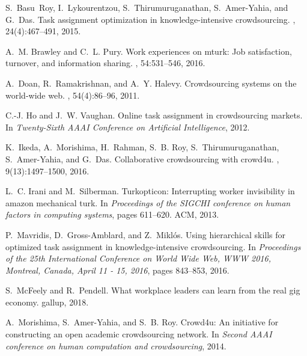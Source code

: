 \documentclass[11pt]{article}
\begin{document}
\begin{thebibliography}{10}

S.~Basu~Roy, I.~Lykourentzou, S.~Thirumuruganathan, S.~Amer-Yahia, and G.~Das.
\newblock Task assignment optimization in knowledge-intensive crowdsourcing.
, 24(4):467--491, 2015.

A.~M. Brawley and C.~L. Pury.
\newblock Work experiences on mturk: Job satisfaction, turnover, and
information sharing.
, 54:531--546, 2016.

A.~Doan, R.~Ramakrishnan, and A.~Y. Halevy.
\newblock Crowdsourcing systems on the world-wide web.
, 54(4):86--96, 2011.

C.-J. Ho and J.~W. Vaughan.
\newblock Online task assignment in crowdsourcing markets.
\newblock In {\em Twenty-Sixth AAAI Conference on Artificial Intelligence},
2012.

K.~Ikeda, A.~Morishima, H.~Rahman, S.~B. Roy, S.~Thirumuruganathan,
S.~Amer-Yahia, and G.~Das.
\newblock Collaborative crowdsourcing with crowd4u.
, 9(13):1497--1500, 2016.

L.~C. Irani and M.~Silberman.
\newblock Turkopticon: Interrupting worker invisibility in amazon mechanical
turk.
\newblock In {\em Proceedings of the SIGCHI conference on human factors in
	computing systems}, pages 611--620. ACM, 2013.

P.~Mavridis, D.~Gross{-}Amblard, and Z.~Mikl{\'{o}}s.
\newblock Using hierarchical skills for optimized task assignment in
knowledge-intensive crowdsourcing.
\newblock In {\em Proceedings of the 25th International Conference on World
	Wide Web, {WWW} 2016, Montreal, Canada, April 11 - 15, 2016}, pages 843--853,
2016.

S.~McFeely and R.~Pendell.
\newblock What workplace leaders can learn from the real gig economy. gallup,
2018.

A.~Morishima, S.~Amer-Yahia, and S.~B. Roy.
\newblock Crowd4u: An initiative for constructing an open academic
crowdsourcing network.
\newblock In {\em Second AAAI conference on human computation and
	crowdsourcing}, 2014.


\end{thebibliography}
\end{document}

